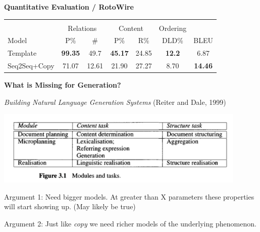 \documentclass[aspectratio=169]{beamer}
\let\tempone\itemize
\let\temptwo\enditemize
\renewenvironment{itemize}{\tempone\addtolength{\itemsep}{0.5\baselineskip}}{\temptwo}
\newcommand{\air}{\vspace{0.25cm}}
\begin{document}
\begin{frame}
  \centerline{\textbf{Quantitative Evaluation / RotoWire}}
  \begin{table}
    \small
    \centering
    \begin{tabular}{lcccccc}
      \toprule
       & \multicolumn{5}{c}{} \\
       & \multicolumn{2}{c}{Relations}  & \multicolumn{2}{c}{Content} & Ordering \\
      Model & P\% & \# & P\% & R\% & DLD\%  & BLEU\\
      \midrule
      Template                 & \textbf{99.35} & 49.7  & \textbf{45.17} & 24.85 & \textbf{12.2} & 6.87    \\
      \midrule
      Seq2Seq+Copy        &   71.07 & 12.61 & 21.90 & 27.27 & 8.70 & \textbf{14.46}\\
      \bottomrule
    \end{tabular}
  \end{table}
\end{frame}


\begin{frame}
  \begin{center}
    \textbf{ What is Missing for  Generation? }
  \end{center}

    \textit{Building Natural Language Generation Systems} (Reiter and Dale, 1999)

\vspace*{-1cm}
 \begin{center}
    \includegraphics[width =12cm]{datadoc}
  \end{center}
  \vspace*{-0.5cm}


  \begin{itemize}
  \item Argument 1: Need bigger models. At greater than X parameters these
    properties will start showing up. (May likely be true)
    \air
  \item Argument 2: Just like \textit{copy} we need richer models of
    the underlying phenomenon.

  \end{itemize}


\end{frame}
\end{document}
